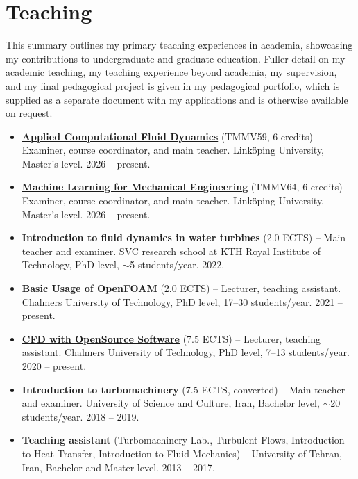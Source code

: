 \section{Teaching}{}

This summary outlines my primary teaching experiences in academia, showcasing my contributions to undergraduate and graduate education. Fuller detail on my academic teaching, my teaching experience beyond academia, my supervision, and my final pedagogical project is given in my pedagogical portfolio, which is supplied as a separate document with my applications and is otherwise available on request.

\begin{itemize}[leftmargin=*,topsep=2pt,itemsep=0.25em]
    \item \href{https://studieinfo.liu.se/en/kurs/TMMV59}{\textbf{Applied Computational Fluid Dynamics}} (TMMV59, 6 credits) -- Examiner, course coordinator, and main teacher. Linköping University, Master's level. 2026 -- present.

    \item \href{https://studieinfo.liu.se/en/kurs/TMMV64}{\textbf{Machine Learning for Mechanical Engineering}} (TMMV64, 6 credits) -- Examiner, course coordinator, and main teacher. Linköping University, Master's level. 2026 -- present.

    \item \textbf{Introduction to fluid dynamics in water turbines} (2.0 ECTS) -- Main teacher and examiner. SVC research school at KTH Royal Institute of Technology, PhD level, $\sim$5 students/year. 2022.

    \item \href{https://www.tfd.chalmers.se/~hani/kurser/OS_CFD/BasicUsageOfOpenFOAM.htm}{\textbf{Basic Usage of OpenFOAM}} (2.0 ECTS) -- Lecturer, teaching assistant. Chalmers University of Technology, PhD level, 17--30 students/year. 2021 -- present.

    \item \href{http://www.tfd.chalmers.se/~hani/kurser/OS_CFD/}{\textbf{CFD with OpenSource Software}} (7.5 ECTS) -- Lecturer, teaching assistant. Chalmers University of Technology, PhD level, 7--13 students/year. 2020 -- present.

    \item \textbf{Introduction to turbomachinery} (7.5 ECTS, converted) -- Main teacher and examiner. University of Science and Culture, Iran, Bachelor level, $\sim$20 students/year. 2018 -- 2019.

    \item \textbf{Teaching assistant} (Turbomachinery Lab., Turbulent Flows, Introduction to Heat Transfer, Introduction to Fluid Mechanics) -- University of Tehran, Iran, Bachelor and Master level. 2013 -- 2017.
\end{itemize}

